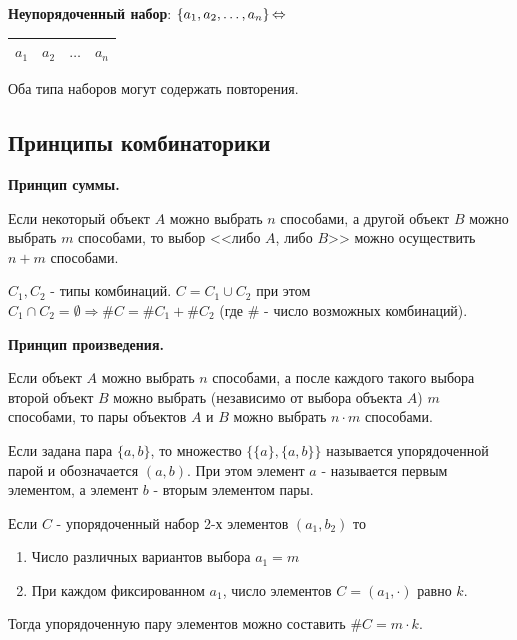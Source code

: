 \textbf{Неупорядоченный набор}: $\{ a_1, a_2, \dots, a_n \} \operatorname{\Leftrightarrow} $
\begin{table}[h]
	\begin{tabular}{|llll|}
		$a_1$ & $a_2$ & $\dots$ & $a_n$ \\ \hline
	\end{tabular}
\end{table}

\begin{remark}
	Оба типа наборов могут содержать повторения.
\end{remark}

\subsection{Принципы комбинаторики}

\textbf{Принцип суммы.}

Если некоторый объект $A$ можно выбрать $n$ способами, а другой объект $B$ можно выбрать $m$ способами, то выбор <<либо $A$, либо $B$>> можно осуществить $n+m$ способами.

$C_1, C_2$ - типы комбинаций. $C = C_1 \cup C_2$ при этом $C_1 \cap C_2 = \emptyset \Rightarrow \# C = \# C_1 + \# C_2$ (где $\#$ - число возможных комбинаций).

\textbf{Принцип произведения.}

Если объект $A$ можно выбрать $n$ способами, а после каждого такого выбора второй объект $B$ можно выбрать (независимо от выбора объекта $A$) $m$ способами, то пары объектов $A$ и $B$  можно выбрать $n \cdot m$ способами.

\begin{definition}
	Если задана пара $\{a,b\}$, то множество $\{ \{a\}, \{a,b\} \}$ называется упорядоченной парой и обозначается $(a, b)$. При этом элемент $a$ - называется первым элементом, а элемент $b$ - вторым элементом пары.
\end{definition}

Если $C$ - упорядоченный набор 2-х элементов $(a_1, b_2)$ то
\begin{enumerate}
	\item Число различных вариантов выбора $a_1 = m$
	\item При каждом фиксированном $a_1$, число элементов $C = (a_1, \cdot)$ равно $k$.
\end{enumerate}
Тогда упорядоченную пару элементов можно составить $\# C = m \cdot k$.

